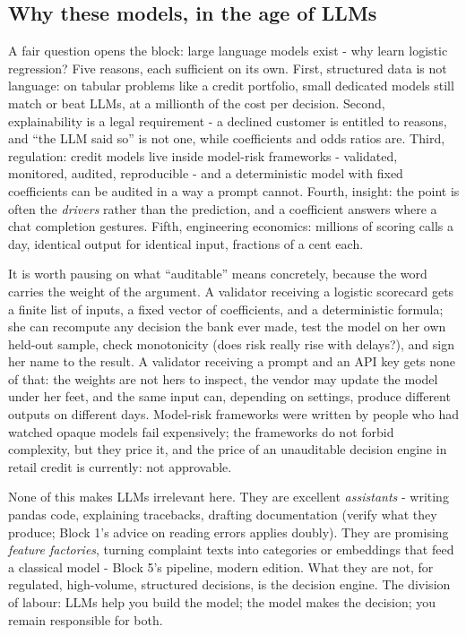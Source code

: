 \documentclass[11pt,a4paper]{article}
\begin{document}
\subsection{Why these models, in the age of LLMs}
A fair question opens the block: large language models exist - why learn
logistic regression? Five reasons, each sufficient on its own. First,
structured data is not language: on tabular problems like a credit
portfolio, small dedicated models still match or beat LLMs, at a millionth
of the cost per decision. Second, explainability is a legal requirement -
a declined customer is entitled to reasons, and ``the LLM said so'' is not
one, while coefficients and odds ratios are. Third, regulation: credit
models live inside model-risk frameworks - validated, monitored, audited,
reproducible - and a deterministic model with fixed coefficients can be
audited in a way a prompt cannot. Fourth, insight: the point is often the
\emph{drivers} rather than the prediction, and a coefficient answers where a
chat completion gestures. Fifth, engineering economics: millions of scoring
calls a day, identical output for identical input, fractions of a cent
each.

It is worth pausing on what ``auditable'' means concretely, because the
word carries the weight of the argument. A validator receiving a logistic
scorecard gets a finite list of inputs, a fixed vector of coefficients,
and a deterministic formula; she can recompute any decision the bank ever
made, test the model on her own held-out sample, check monotonicity
(does risk really rise with delays?), and sign her name to the result. A
validator receiving a prompt and an API key gets none of that: the
weights are not hers to inspect, the vendor may update the model under
her feet, and the same input can, depending on settings, produce
different outputs on different days. Model-risk frameworks were written
by people who had watched opaque models fail expensively; the frameworks
do not forbid complexity, but they price it, and the price of an
unauditable decision engine in retail credit is currently: not
approvable.

None of this makes LLMs irrelevant here. They are excellent
\emph{assistants} - writing pandas code, explaining tracebacks, drafting
documentation (verify what they produce; Block 1's advice on reading errors
applies doubly). They are promising \emph{feature factories}, turning
complaint texts into categories or embeddings that feed a classical model
- Block 5's pipeline, modern edition. What they are not, for regulated,
high-volume, structured decisions, is the decision engine. The division of
labour: LLMs help you build the model; the model makes the decision; you
remain responsible for both.
\end{document}
